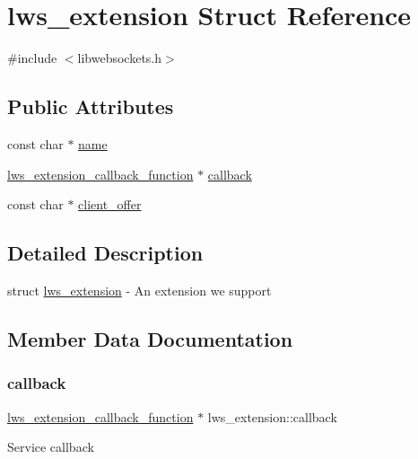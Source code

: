 \hypertarget{structlws__extension}{}\section{lws\+\_\+extension Struct Reference}
\label{structlws__extension}


{\ttfamily \#include $<$libwebsockets.\+h$>$}

\subsection*{Public Attributes}
\begin{DoxyCompactItemize}
\item 
const char $\ast$ \hyperlink{structlws__extension_a5496d751f2e4d9507e78462aa20f6c03}{name}
\item 
\hyperlink{group__extensions_gaae7169b2cd346b34fa33d0250db2afd0}{lws\+\_\+extension\+\_\+callback\+\_\+function} $\ast$ \hyperlink{structlws__extension_ab7028b0f4920fefd72b2ca91e01e3d95}{callback}
\item 
const char $\ast$ \hyperlink{structlws__extension_a279d398be22f2ac289b47fbb7dd13bd0}{client\+\_\+offer}
\end{DoxyCompactItemize}


\subsection{Detailed Description}
struct \hyperlink{structlws__extension}{lws\+\_\+extension} -\/ An extension we support 

\subsection{Member Data Documentation}
\mbox{\label{structlws__extension_ab7028b0f4920fefd72b2ca91e01e3d95}} 
\subsubsection{\texorpdfstring{callback}{callback}}
{\footnotesize\ttfamily \hyperlink{group__extensions_gaae7169b2cd346b34fa33d0250db2afd0}{lws\+\_\+extension\+\_\+callback\+\_\+function} $\ast$ lws\+\_\+extension\+::callback}

Service callback \mbox{\label{structlws__extension_a279d398be22f2ac289b47fbb7dd13bd0}} 
